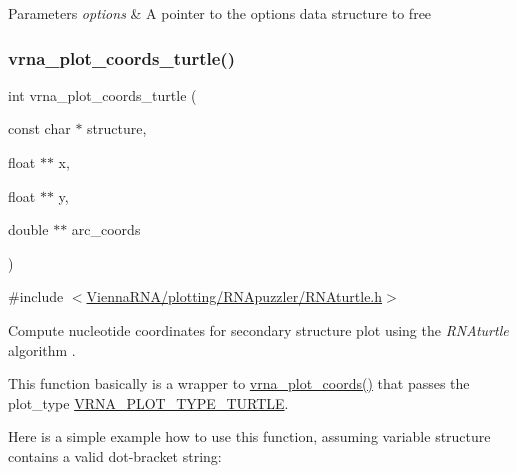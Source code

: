 \begin{DoxyParams}{Parameters}
{\em options} & A pointer to the options data structure to free \\
\hline
\end{DoxyParams}
\mbox{\label{group__plot__layout__utils_ga195139110e2877b92c7f82d05b6dad19}} 
\subsubsection{\texorpdfstring{vrna\_plot\_coords\_turtle()}{vrna\_plot\_coords\_turtle()}}
{\footnotesize\ttfamily int vrna\+\_\+plot\+\_\+coords\+\_\+turtle (\begin{DoxyParamCaption}\item[{const char $\ast$}]{structure,  }\item[{float $\ast$$\ast$}]{x,  }\item[{float $\ast$$\ast$}]{y,  }\item[{double $\ast$$\ast$}]{arc\+\_\+coords }\end{DoxyParamCaption})}



{\ttfamily \#include $<$\mbox{\hyperlink{RNAturtle_8h}{Vienna\+R\+N\+A/plotting/\+R\+N\+Apuzzler/\+R\+N\+Aturtle.\+h}}$>$}



Compute nucleotide coordinates for secondary structure plot using the {\itshape R\+N\+Aturtle} algorithm \cite{wiegreffe:2018}. 

This function basically is a wrapper to \mbox{\hyperlink{group__plot__layout__utils_ga2e2adbef0283a8ff2dfe5284eb1f4a6a}{vrna\+\_\+plot\+\_\+coords()}} that passes the {\ttfamily plot\+\_\+type} \mbox{\hyperlink{group__plot__layout__utils_ga382c1c5c0b1943500aa4bb55b7658a33}{V\+R\+N\+A\+\_\+\+P\+L\+O\+T\+\_\+\+T\+Y\+P\+E\+\_\+\+T\+U\+R\+T\+LE}}.

Here is a simple example how to use this function, assuming variable {\ttfamily structure} contains a valid dot-\/bracket string\+: 
\begin{DoxyCode}{0}
\DoxyCodeLine{}
\DoxyCodeLine{\} \textcolor{keywordflow}{else} \{}
\DoxyCodeLine{\}}
\DoxyCodeLine{}
\end{DoxyCode}



